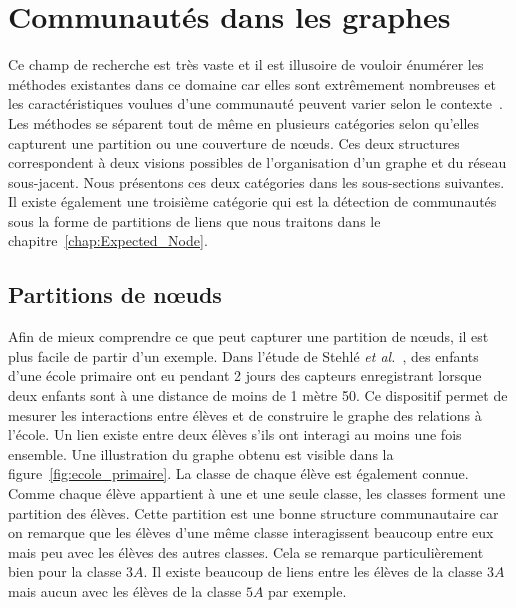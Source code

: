 \section{Communautés dans les graphes}
\label{sec:intro_communaute}

Ce champ de recherche est très vaste et il est illusoire de vouloir énumérer les méthodes existantes dans ce domaine car elles sont extrêmement nombreuses et les caractéristiques voulues d'une communauté peuvent varier selon le contexte~\cite{Leskovec2008,Coscia2011,Yang2015,Jeub2015}.
Les méthodes se séparent tout de même en plusieurs catégories selon qu'elles capturent une partition ou une couverture de n\oe{}uds.
Ces deux structures correspondent à deux visions possibles de l'organisation d'un graphe et du réseau sous-jacent.
Nous présentons ces deux catégories dans les sous-sections suivantes.
Il existe également une troisième catégorie qui est la détection de communautés sous la forme de partitions de liens que nous traitons dans le chapitre~\ref{chap:Expected_Node}.

\subsection{Partitions de n\oe{}uds}
\label{subsec:Part_noeuds}
Afin de mieux comprendre ce que peut capturer une partition de n\oe{}uds, il est plus facile de partir d'un exemple.
Dans l'étude de Stehlé \emph{et al.}~\cite{Stehle2011}, des enfants d'une école primaire ont eu pendant 2 jours des capteurs enregistrant lorsque deux enfants sont à une distance de moins de 1 mètre 50.
Ce dispositif permet de mesurer les interactions entre élèves et de construire le graphe des relations à l'école.
Un lien existe entre deux élèves s'ils ont interagi au moins une fois ensemble.
Une illustration du graphe obtenu est visible dans la figure~\ref{fig:ecole_primaire}.
La classe de chaque élève est également connue.
Comme chaque élève appartient à une et une seule classe, les classes forment une partition des élèves.
Cette partition est une bonne structure communautaire car on remarque que les élèves d'une même classe interagissent beaucoup entre eux mais peu avec les élèves des autres classes.
Cela se remarque particulièrement bien pour la classe $3A$.
Il existe beaucoup de liens entre les élèves de la classe $3A$ mais aucun avec les élèves de la classe $5A$ par exemple.

